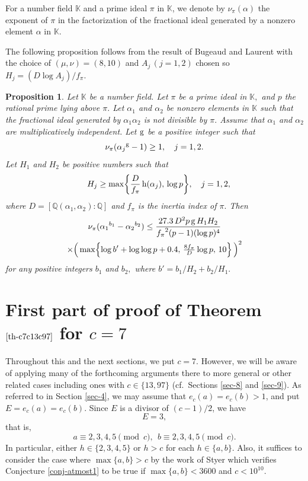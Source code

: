\documentclass[11pt]{amsart}
\newtheorem{prop}{Proposition}[section]
\numberwithin{equation}{section}
\begin{document}
For a number field $\mathbb K$ and a prime ideal $\pi$ in $\mathbb K$, we denote by $\nu_{\pi}(\alpha)$ the exponent of $\pi$ in the factorization of the fractional ideal generated by a nonzero element $\alpha$ in $\mathbb K$.

The following proposition follows from the result of Bugeaud and Laurent \cite[Th\'eor\`eme 4]{BuLa} with the choice of $(\mu,\nu)=(8,10)$ and $A_j\,(j=1,2)$ chosen so $H_j=(D \log A_j) /f_\pi$.

\begin{prop}\label{prop-BL}
Let $\mathbb K$ be a number field.
Let $\pi$ be a prime ideal in $\mathbb K,$ and $p$ the rational prime lying above $\pi.$
Let $\alpha_1$ and $\alpha_2$ be nonzero elements in $\mathbb K$ such that the fractional ideal generated by $\alpha_1 \alpha_2$ is not divisible by $\pi.$
Assume that $\alpha_1$ and $\alpha_2$ are multiplicatively independent.
Let ${\rm g}$ be a positive integer such that
\[
\nu_{\pi}({\alpha_j}^{\rm g} - 1) \ge 1, \quad j=1,2.
\]
Let $H_1$ and $H_2$ be positive numbers such that
\[
\quad H_j \ge \max \biggl\{ \frac{D}{f_{\pi}}\,{\rm h}(\alpha_j), \, \log p \biggl\}, \quad j=1,2,
\]
where $D=[\mathbb Q(\alpha_1,\alpha_2):\mathbb Q]$ and $f_{\pi}$ is the inertia index of $\pi.$
Then
\begin{multline*}
\nu_{\pi}({\alpha_1}^{b_1}-{\alpha_2}^{b_2}) \le
\frac{27.3 \, D^2 p\, {\rm g} \, H_1 H_2}{{f_{\pi}}^2(p-1)(\log p)^4}\\
\times \Bigl(\,\max \Bigl\{ \log b'+\log \log p+0.4,\,\textstyle{\frac{8 f_{\pi}}{D}}\log p,\,10 \Bigl\}\,\Bigl)^2
\end{multline*}
for any positive integers $b_1$ and $b_2,$ where $b'=b_1/H_2+b_2/H_1.$
\end{prop}

\section{First part of proof of Theorem $\ref{th-c7c13c97}$ for $c=7$}\label{sec-6}

Throughout this and the next sections, we put $c=7$.
However, we will be aware of applying many of the forthcoming arguments there to more general or other related cases including ones with $c \in \{13,97\}$ (cf.~Sections \ref{sec-8} and \ref{sec-9}).
As referred to in Section \ref{sec-4}, we may assume that $e_{c}(a)=e_{c}(b)>1$, and put $E=e_{c}(a)=e_{c}(b)$.
Since $E$ is a divisor of $(c-1)/2$, we have 
\[
E=3,
\]
that is, 
\[
a \equiv 2,3,4,5 \pmod{c}, \ \ b \equiv 2,3,4,5 \pmod{c}.
\]
In particular, either $h \in \{2,3,4,5\}$ or $h>c$ for each $h \in \{a,b\}$.
Also, it suffices to consider the case where $\max\{a,b\}>c$ by the work of Styer \cite[Theorem 1.1]{St} which verifies Conjecture \ref{conj-atmost1} to be true if $\max\{a,b\}<3600$ and $c<10^{10}$. 
\end{document}
